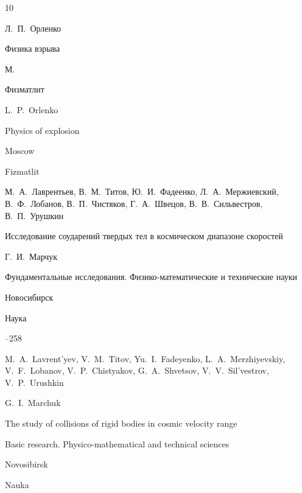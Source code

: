 \begin{thebibliography}{10}


\by Л.~П.~Орленко

\book Физика взрыва 


\publaddr М.

\publ Физматлит



\misctransl

\by L.~P.~Orlenko

\book Physics of explosion


\publaddr Moscow

\publ Fizmatlit














\by М.~А.~Лаврентьев, В.~М.~Титов, Ю.~И.~Фадеенко, Л.~А.~Мержиевский, В.~Ф.~Лобанов, В.~П.~Чистяков, Г.~А.~Швецов, В.~В.~Сильвестров, В.~П.~Урушкин 

\paper Исследование соударений твердых тел в космическом диапазоне скоростей 

\ed Г.~И.~Марчук

\inbook Фундаментальные исследования. Физико-математические и технические науки

\publaddr Новосибирск

\publ Наука


--258 

\misctransl

\by M.~A.~Lavrent'yev, V.~M.~Titov, Yu.~I.~Fadeyenko, L.~A.~Merzhiyevskiy, V.~F.~Lobanov, V.~P.~Chistyakov, G.~A.~Shvetsov, V.~V.~Sil'vestrov, V.~P.~Urushkin

\ed G.~I.~Marchuk

\paper The study of collisions of rigid bodies in cosmic velocity range

\inbook Basic research. Physico-mathematical and technical sciences

\publaddr Novosibirsk

\publ Nauka


\end{thebibliography}
